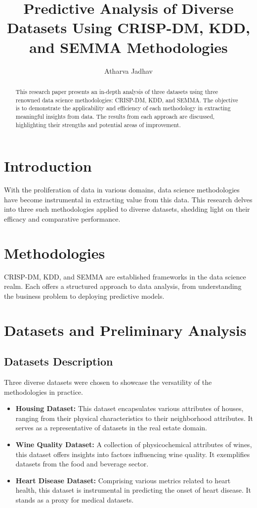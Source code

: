\documentclass{article}
\title{Predictive Analysis of Diverse Datasets Using CRISP-DM, KDD, and SEMMA Methodologies}
\author{Atharva Jadhav}
\begin{document}
\maketitle

\begin{abstract}
This research paper presents an in-depth analysis of three datasets using three renowned data science methodologies: CRISP-DM, KDD, and SEMMA. The objective is to demonstrate the applicability and efficiency of each methodology in extracting meaningful insights from data. The results from each approach are discussed, highlighting their strengths and potential areas of improvement.
\end{abstract}

\section{Introduction}
With the proliferation of data in various domains, data science methodologies have become instrumental in extracting value from this data. This research delves into three such methodologies applied to diverse datasets, shedding light on their efficacy and comparative performance.

\section{Methodologies}
CRISP-DM, KDD, and SEMMA are established frameworks in the data science realm. Each offers a structured approach to data analysis, from understanding the business problem to deploying predictive models.

\section{Datasets and Preliminary Analysis}

\subsection{Datasets Description}
Three diverse datasets were chosen to showcase the versatility of the methodologies in practice.

\begin{itemize}
    \item \textbf{Housing Dataset:} This dataset encapsulates various attributes of houses, ranging from their physical characteristics to their neighborhood attributes. It serves as a representative of datasets in the real estate domain.
    
    \item \textbf{Wine Quality Dataset:} A collection of physicochemical attributes of wines, this dataset offers insights into factors influencing wine quality. It exemplifies datasets from the food and beverage sector.
    
    \item \textbf{Heart Disease Dataset:} Comprising various metrics related to heart health, this dataset is instrumental in predicting the onset of heart disease. It stands as a proxy for medical datasets.
\end{itemize}
\end{document}
